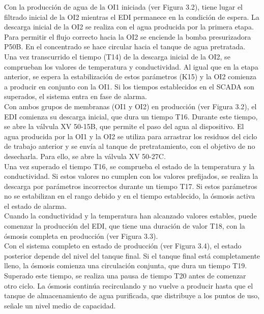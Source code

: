 Con la producción de agua de la OI1 iniciada (ver Figura 3.2), tiene lugar el filtrado
inicial de la OI2 mientras el EDI permanece en la condición de espera.
La descarga inicial de la OI2 se realiza con el agua producida por la primera etapa.
Para permitir el flujo correcto hacia la OI2 se enciende la bomba
presurizadora P50B. En el concentrado se hace circular
hacia el tanque de agua pretratada.\\

Una vez transcurrido el tiempo (T14) de la descarga inicial de la OI2, se
comprueban los valores de temperatura y conductividad. Al igual que en la etapa
anterior, se espera la estabilización de estos parámetros (K15) y la OI2
comienza a producir en conjunto con la OI1. Si los tiempos establecidos en
el SCADA son superados, el sistema entra en fase de alarma.\\

Con ambos grupos de membranas (OI1 y OI2) en producción (ver Figura 3.2),
el EDI comienza su descarga inicial, que dura un tiempo T16. Durante este
tiempo, se abre la válvula XV 50-15B, que permite el paso del agua al
dispositivo. El agua producida por la OI1 y la OI2 se utiliza para arrastrar
los residuos del ciclo de trabajo anterior y se envía al tanque de pretratamiento,
con el objetivo de no desecharla. Para ello, se abre la válvula XV 50-27C.\\

Una vez superado el tiempo T16, se comprueba el estado de la temperatura y la
conductividad. Si estos valores no cumplen con los valores prefijados, se realiza
la descarga por parámetros incorrectos durante un tiempo T17. Si estos parámetros
no se estabilizan en el rango debido y en el tiempo establecido, la ósmosis activa
el estado de alarma.\\

Cuando la conductividad y la temperatura han alcanzado valores estables, puede
comenzar la producción del EDI, que tiene una duración de valor T18, con la
ósmosis completa en producción (ver Figura 3.3).\\

Con el sistema completo en estado de producción (ver Figura 3.4), el estado
posterior depende del nivel del tanque final. Si el tanque final está
completamente lleno, la ósmosis comienza una circulación conjunta, que dura un
tiempo T19. Superado este tiempo, se realiza una pausa de tiempo T20 antes de
comenzar otro ciclo. La ósmosis continúa recirculando y no vuelve a producir
hasta que el tanque de almacenamiento de agua purificada, que distribuye a los
puntos de uso, señale un nivel medio de capacidad.\\

